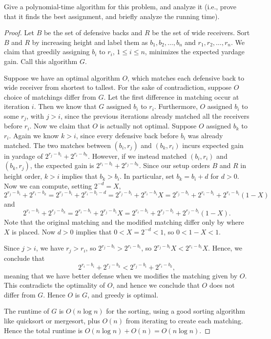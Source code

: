 \documentclass[10pt]{article}
\begin{document}
Give a polynomial-time algorithm for this problem, and analyze it (i.e., prove that it finds the best assignment, and briefly analyze the running time).

\begin{proof}
  Let \(B\) be the set of defensive backs and \(R\) be the set of wide receivers. Sort \(B\) and \(R\) by increasing height and label them as \(b_1, b_2, \dots, b_n\) and \(r_1, r_2, \dots, r_n\). We claim that greedily assigning \(b_i\) to \(r_i\), \(1 \le i \le n\), minimizes the expected yardage gain. Call this algorithm \(G\). 

  Suppose we have an optimal algorithm \(O\), which matches each defensive back to wide receiver from shortest to tallest. For the sake of contradiction, suppose \(O\) choice of matchings differ from \(G\). Let the first difference in matching occur at iteration \(i\). Then we know that \(G\) assigned \(b_i\) to \(r_i\). Furthermore, \(O\) assigned \(b_i\) to some \(r_j\), with \(j > i\), since the previous iterations already matched all the receivers before \(r_i\). Now we claim that \(O\) is actually not optimal. Suppose \(O\) assigned \(b_k\) to \(r_i\). Again we know \(k > i\), since every defensive back before \(b_i\) was already matched. The two matches between \((b_i, r_j)\) and \((b_k, r_i)\) incurs expected gain in yardage of \(2^{r_j - b_i} + 2^{r_i - b_k}\). However, if we instead matched \((b_i, r_i)\) and \((b_k, r_j)\), the expected gain is \(2^{r_i - b_i} + 2^{r_j - b_k}\). Since our setup orders \(B\) and \(R\) in height order, \(k > i\) implies that \(b_k > b_i\). In particular, set \(b_k = b_i + d\) for \(d > 0\). Now we can compute, setting \(2^{-d} = X\),
  \[2^{r_j - b_i} + 2^{r_i - b_k} = 2^{r_j - b_i} + 2^{r_i - b_i - d} = 2^{r_j - b_i} + 2^{r_i - b_i} X = 2^{r_j - b_i} + 2^{r_i - b_i} + 2^{r_i - b_i} (1 - X)\]
  and 
  \[2^{r_i - b_i} + 2^{r_j - b_k} = 2^{r_i - b_i} + 2^{r_j - b_i} X = 2^{r_i - b_i} + 2^{r_j - b_i} + 2^{r_j - b_i} (1 - X).\]
  Note that the original matching and the modified matching differ only by where \(X\) is placed. Now \(d > 0\) implies that \(0 < X = 2^{-d} < 1\), so \(0 < 1 - X < 1\). 

  Since \(j > i\), we have \(r_j > r_i\), so \(2^{r_j - b_i} > 2^{r_i - b_i}\), so \(2^{r_j - b_i} X < 2^{r_i - b_i} X\). Hence, we conclude that 
  \[2^{r_i - b_i} + 2^{r_j - b_k} < 2^{r_j - b_i} + 2^{r_i - b_k},\]
  meaning that we have better defense when we modifies the matching given by \(O\). This contradicts the optimality of \(O\), and hence we conclude that \(O\) does not differ from \(G\). Hence \(O\) is \(G\), and greedy is optimal.

  The runtime of \(G\) is \(O(n \log n)\) for the sorting, using a good sorting algorithm like quicksort or mergesort, plus \(O(n)\) from iterating to create each matching. Hence the total runtime is \(O(n \log n) + O(n) = O(n \log n)\).


\end{proof}
\end{document}
